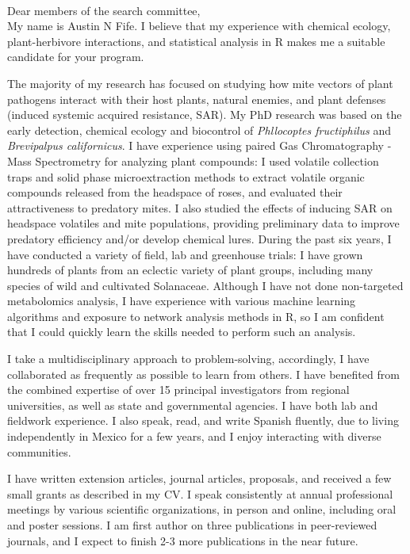 \documentclass[11pt]{letter} %
\begin{document}
\begin{letter}
\\
Dear members of the search committee,\\

My name is Austin N Fife. I believe that my experience with chemical ecology, plant-herbivore interactions, and statistical analysis in R makes me a suitable candidate for your program.

The majority of my research has focused on studying how mite vectors of plant pathogens interact with their host plants, natural enemies, and plant defenses (induced systemic acquired resistance, SAR). My PhD research was based on the early detection, chemical ecology and biocontrol of \textit{Phllocoptes fructiphilus} and \textit{Brevipalpus californicus}. I have experience using paired Gas Chromatography - Mass Spectrometry for analyzing plant compounds: I used volatile collection traps and solid phase microextraction methods to extract volatile organic compounds released from the headspace of roses, and evaluated their attractiveness to predatory mites. I also studied the effects of inducing SAR on headspace volatiles and mite populations, providing preliminary data to improve predatory efficiency and/or develop chemical lures. During the past six years, I have conducted a variety of field, lab and greenhouse trials: I have grown hundreds of plants from an eclectic variety of plant groups, including many species of wild and cultivated Solanaceae. Although I have not done non-targeted metabolomics analysis, I have experience with various machine learning algorithms and exposure to network analysis methods in R, so I am confident that I could quickly learn the skills needed to perform such an analysis.

I take a multidisciplinary approach to problem-solving, accordingly, I have collaborated as frequently as possible to learn from others. I have benefited from the combined expertise of over 15 principal investigators from regional universities, as well as state and governmental agencies. I have both lab and fieldwork experience. I also speak, read, and write Spanish fluently, due to living independently in Mexico for a few years, and I enjoy interacting with diverse communities. 

I have written extension articles, journal articles, proposals, and received a few small grants as described in my CV. I speak consistently at annual professional meetings by various scientific organizations, in person and online, including oral and poster sessions. I am first author on three publications in peer-reviewed journals, and I expect to finish 2-3 more publications in the near future.


\end{letter}
\end{document}

